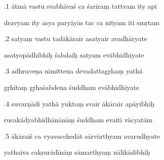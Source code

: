 \documentclass[article,12pt,a4paper]{memoir}%
\newcounter{parCount}
\begin{document}
	  
	  \pstart {}.1 ātmā vastu svabhāvaś ca śarīraṃ tattvam ity api 
	{}
	\pend%
      

	  
	  \pstart \leavevmode%
	dravyam ity asya paryāyās tac ca nityam iti smṛtam 
	{}
	\pend%
      

	  
	  \pstart {}.2 satyaṃ vastu tadākārair asatyair avadhāryate 
	{}
	\pend%
      

	  
	  \pstart \leavevmode%
	asatyopādhibhiḥ śabdaiḥ satyam evābhidhīyate 
	{}
	\pend%
      

	  
	  \pstart {}.3 adhruveṇa nimittena devadattagṛhaṃ yathā 
	{}
	\pend%
      

	  
	  \pstart \leavevmode%
	gṛhītaṃ gṛhaśabdena śuddham evābhidhīyate 
	{}
	\pend%
      

	  
	  \pstart {}.4 suvarṇādi yathā yuktaṃ svair ākārair apāyibhiḥ 
	{}
	\pend%
      

	  
	  \pstart \leavevmode%
	rucakādyabhidhānānāṃ śuddham evaiti vācyatām 
	{}
	\pend%
      

	  
	  \pstart {}.5 ākāraiś ca vyavacchedāt sārvārthyam avarudhyate 
	{}
	\pend%
      

	  
	  \pstart \leavevmode%
	yathaiva cakṣurādīnāṃ sāmarthyaṃ nālikādibhiḥ 
	{}
	\pend%
      
\end{document}
